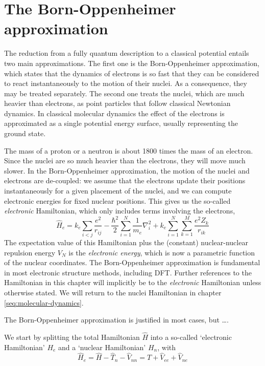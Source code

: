 \documentclass[11pt]{scrbook}   %
\begin{document}
\section{The Born-Oppenheimer approximation}\label{seq:born-oppenheimer}

The reduction from a fully quantum description to a classical potential entails two main approximations. The first one is the Born-Oppenheimer approximation, which states that the dynamics of electrons is so fast that they can be considered to react instantaneously to the motion of their nuclei. As a consequence, they may be treated separately. The second one treats the nuclei, which are much heavier than electrons, as point particles that follow classical Newtonian dynamics. In classical molecular dynamics the effect of the electrons is approximated as a single potential energy surface, usually representing the ground state.

The mass of a proton or a neutron is about 1800 times the mass of an electron.
Since the nuclei are so much heavier than the electrons, they will move much
slower. In the Born-Oppenheimer approximation, the motion of the 
nuclei and
electrons are de-coupled: we assume that the electrons update their positions
instantaneously for a given placement of the nuclei, and we can compute
electronic energies for fixed nuclear positions. This gives us the so-called
\emph{electronic} Hamiltonian, which only includes terms involving the
electrons,
\begin{equation}
  \hat{H}_e = 
	k_e  \sum_{i<j}\frac{e^2}{r_{ij}}
	-\frac{\hbar^2}{2}\sum_{i=1}^N\frac{1}{m_e}\nabla_i^2
		+ k_e \sum_{i=1}^N\sum_{k=1}^M \frac{e^2Z_k}{r_{ik}}
  \label{eq:el-hamiltonian}
\end{equation}
The expectation value of this Hamiltonian plus the (constant) nuclear-nuclear 
repulsion energy $V_N$ is the \emph{electronic energy}, which
is now a parametric function of the nuclear coordinates. The Born-Oppenheimer
approximation is fundamental in most electronic structure methods, including
DFT. Further references to the Hamiltonian in this chapter will implicitly 
be to the \emph{electronic} Hamiltonian unless otherwise stated. 
We will return to the nuclei Hamiltonian in chapter \ref{seq:molecular-dynamics}.



The Born-Oppenheimer approximation is justified in most 
cases\cite[p. 111]{Cramer:2004}, but \dots.

We start by splitting the total Hamiltonian $\hat{H}$ into a so-called `electronic Hamiltonian' $H_e$ and a `nuclear Hamiltonian' $H_n$, with
\begin{equation}
  \hat{H}_e = \hat{H} - \hat{T}_n - \hat{V}_{nn} = \hat{T} + \hat{V}_{ee} + \hat{V}_{ne}
\end{equation}
\end{document}
